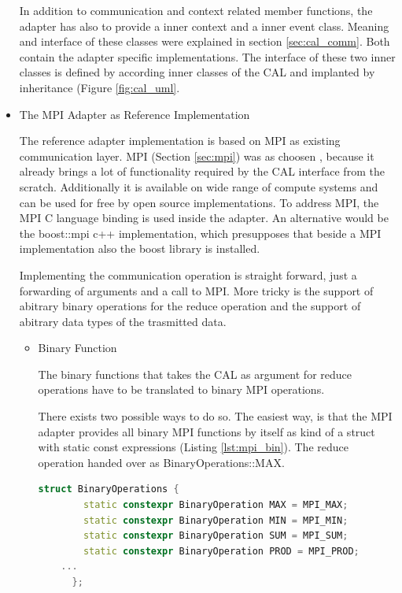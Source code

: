 \begin{itemize}
  In addition to communication and context related member functions,
  the adapter has also to provide a inner context and a inner event
  class. Meaning and interface of these classes were explained in
  section \ref{sec:cal_comm}. Both contain the adapter specific
  implementations. The interface of these two inner classes is defined
  by according inner classes of the CAL and implanted by inheritance
  (Figure \ref{fig:cal_uml}.

\item The MPI Adapter as Reference Implementation

  The reference adapter implementation is based on MPI as existing
  communication layer.  MPI (Section \ref{sec:mpi}) was as choosen ,
  because it already brings a lot of functionality required by the CAL
  interface from the scratch. Additionally it is available on wide
  range of compute systems and can be used for free by open source
  implementations. To address MPI, the MPI C language binding is used
  inside the adapter. An alternative would be the boost::mpi c++
  implementation, which presupposes that beside a MPI implementation
  also the boost library is installed.

  Implementing the communication operation is straight forward, just a
  forwarding of arguments and a call to MPI. More tricky is the
  support of abitrary binary operations for the reduce operation and
  the support of abitrary data types of the trasmitted data.

  \begin{itemize}
  \item Binary Function

    The binary functions that takes the CAL as argument for reduce 
    operations have to be translated to binary MPI operations.

    There exists two possible ways to do so. The easiest way, is that
    the MPI adapter provides all binary MPI functions by itself as
    kind of a struct with static const expressions (Listing
    \ref{lst:mpi_bin}). The reduce operation handed over as
    BinaryOperations::MAX.

    \begin{lstlisting}[language=C++]
      struct BinaryOperations { 	
        static constexpr BinaryOperation MAX = MPI_MAX; 	
        static constexpr BinaryOperation MIN = MPI_MIN; 	
        static constexpr BinaryOperation SUM = MPI_SUM; 	
        static constexpr BinaryOperation PROD = MPI_PROD;
	...
      };
    \end{lstlisting}
    \label{lst:mpi_bin}


\end{itemize}
\end{itemize}
